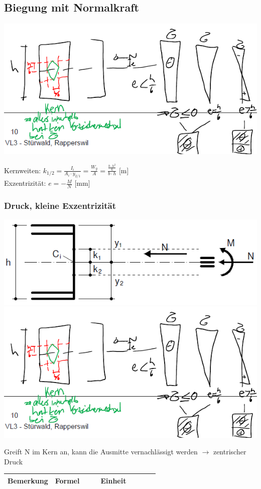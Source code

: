 \begin{multicols}{2}
	
	
	\subsection{Biegung mit Normalkraft}
	
	
	\includegraphics[width=0.5\linewidth]{images/Risse6Kern.PNG}
	
	
	Kernweiten:	 $ k_{1/2} = \frac{I_i}{A_i \cdot y_{2/1}} = \frac{W_y}{A} = \frac{  \frac{b \cdot h^2}{6}  }{b \cdot h} $  [m] \\	
	Exzentrizität: $ e = -\frac{M}{N} $ [mm]
	
	
	
	\subsubsection{Druck, kleine Exzentrizität}
	
	
	\includegraphics[width=0.5\linewidth]{images/Risse5klExPNG} \\
	\includegraphics[width=0.5\linewidth]{images/Risse6Kern.PNG}
	
	
	Greift N im Kern an, kann die Ausmitte vernachlässigt werden $ \rightarrow $ zentrischer Druck
	
	\begin{tabular}{p{0.3\linewidth}|p{0.3\linewidth}|l}
		
		Bemerkung		& Formel		& Einheit \\ \hline
		

\end{tabular}
\end{multicols}
